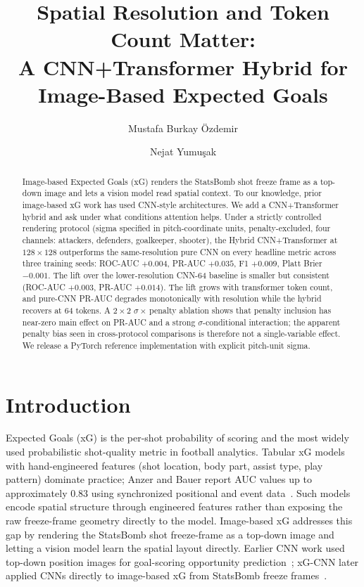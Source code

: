 \documentclass[runningheads,a4paper]{llncs}
\title{Spatial Resolution and Token Count Matter:\texorpdfstring{\\}{ }%
A CNN+Transformer Hybrid for Image-Based Expected Goals}
\author{Mustafa Burkay \"Ozdemir\inst{1}\orcidID{0009-0007-3701-0084} \and
Nejat Yumu\c{s}ak\inst{1}\orcidID{0000-0001-5005-8604}}
\institute{Sakarya University, Department of Computer Engineering, Sakarya, Turkey\\
\email{mustafa.ozdemir24@ogr.sakarya.edu.tr, nyumusak@sakarya.edu.tr}}
\begin{document}
\maketitle

\begin{abstract}
Image-based Expected Goals (xG) renders the StatsBomb shot freeze
frame as a top-down image and lets a vision model read spatial
context. To our knowledge, prior image-based xG work has used
CNN-style architectures. We add a CNN+Transformer hybrid and ask
under what conditions attention helps.
Under a strictly controlled rendering protocol (sigma specified in
pitch-coordinate units, penalty-excluded, four channels: attackers,
defenders, goalkeeper, shooter), the Hybrid CNN+Transformer at
$128{\times}128$ outperforms the same-resolution pure CNN on every
headline metric across three training seeds: ROC-AUC $+0.004$,
PR-AUC $+0.035$, F1 $+0.009$, Platt Brier $-0.001$. The lift over
the lower-resolution CNN-64 baseline is smaller but consistent
(ROC-AUC $+0.003$, PR-AUC $+0.014$). The lift grows
with transformer token count, and pure-CNN PR-AUC degrades
monotonically with resolution while the hybrid recovers at 64 tokens.
A $2{\times}2$ $\sigma{\times}$\,penalty ablation shows that penalty
inclusion has near-zero main effect on PR-AUC and a strong
$\sigma$-conditional interaction; the apparent penalty bias seen in
cross-protocol comparisons is therefore not a single-variable effect.
We release a PyTorch reference implementation with explicit
pitch-unit sigma.

\end{abstract}

\section{Introduction}
\label{sec:intro}

Expected Goals (xG) is the per-shot probability of scoring and the
most widely used probabilistic shot-quality metric in football
analytics. Tabular xG models with hand-engineered features (shot
location, body part, assist type, play pattern) dominate practice;
Anzer and Bauer report AUC values up to approximately $0.83$ using
synchronized positional and event data~\cite{anzer2021xg}. Such
models encode spatial structure through engineered features rather
than exposing the raw freeze-frame geometry directly to the model.
Image-based xG addresses this gap by rendering the StatsBomb shot
freeze-frame as a top-down image and letting a vision model learn
the spatial layout directly. Earlier CNN work used top-down position
images for goal-scoring opportunity prediction~\cite{wagenaar2017xg};
xG-CNN later applied CNNs directly to image-based xG from StatsBomb
freeze frames~\cite{matteotti2024xgcnn}.
\end{document}
